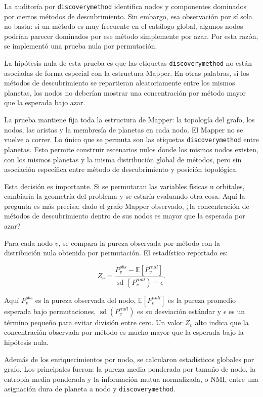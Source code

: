 La auditoría por \texttt{discoverymethod} identifica nodos y componentes dominados por ciertos métodos de descubrimiento. Sin embargo, esa observación por sí sola no basta: si un método es muy frecuente en el catálogo global, algunos nodos podrían parecer dominados por ese método simplemente por azar. Por esta razón, se implementó una prueba nula por permutación.

La hipótesis nula de esta prueba es que las etiquetas \texttt{discoverymethod} no están asociadas de forma especial con la estructura Mapper. En otras palabras, si los métodos de descubrimiento se repartieran aleatoriamente entre los mismos planetas, los nodos no deberían mostrar una concentración por método mayor que la esperada bajo azar.

La prueba mantiene fija toda la estructura de Mapper: la topología del grafo, los nodos, las aristas y la membresía de planetas en cada nodo. El Mapper no se vuelve a correr. Lo único que se permuta son las etiquetas \texttt{discoverymethod} entre planetas. Esto permite construir escenarios nulos donde los mismos nodos existen, con los mismos planetas y la misma distribución global de métodos, pero sin asociación específica entre método de descubrimiento y posición topológica.

Esta decisión es importante. Si se permutaran las variables físicas u orbitales, cambiaría la geometría del problema y se estaría evaluando otra cosa. Aquí la pregunta es más precisa: dado el grafo Mapper observado, ¿la concentración de métodos de descubrimiento dentro de sus nodos es mayor que la esperada por azar?

Para cada nodo \(v\), se compara la pureza observada por método con la distribución nula obtenida por permutación. El estadístico reportado es:

\[
Z_v =
\frac{
P_v^{obs}-\mathbb{E}[P_v^{null}]
}{
\operatorname{sd}(P_v^{null})+\epsilon
}.
\]

Aquí \(P_v^{obs}\) es la pureza observada del nodo, \(\mathbb{E}[P_v^{null}]\) es la pureza promedio esperada bajo permutaciones, \(\operatorname{sd}(P_v^{null})\) es su desviación estándar y \(\epsilon\) es un término pequeño para evitar división entre cero. Un valor \(Z_v\) alto indica que la concentración observada por método es mucho mayor que la esperada bajo la hipótesis nula.

Además de los enriquecimientos por nodo, se calcularon estadísticos globales por grafo. Los principales fueron: la pureza media ponderada por tamaño de nodo, la entropía media ponderada y la información mutua normalizada, o NMI, entre una asignación dura de planeta a nodo y \texttt{discoverymethod}.

